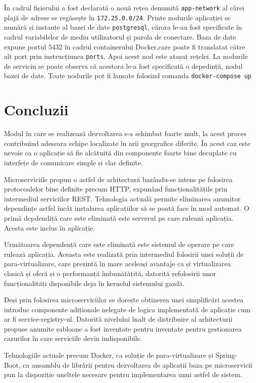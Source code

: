 \documentclass[12pt, a4paper, oneside, romanian]{teza-upb}
\begin{document}
În cadrul fișierului a fost declarată o nouă rețea denumită \texttt{app-network} al cărei plajă de adrese se regăsește în \texttt{172.25.0.0/24}. Printe nodurile aplicației se numără și instanțe al bazei de date \texttt{postgresql}, cărora le-au fost specificate în cadrul variabilelor de mediu utilizatorul și parola de conectare. Baza de date expune portul 5432 în cadrul containerului Docker,care poate fi translatat către alt port prin instrucțiunea \texttt{ports}. Apoi acest nod este atașat rețelei. La nodurile de serviciu se poate observa că acestora le-a fost specificată o depedință, nodul bazei de date. Toate nodurile pot fi lansate folosind comanda \texttt{docker-compose up}

\chapter{Concluzii}

Modul în care se realizează dezvoltarea s-a schimbat foarte mult, la acest proces contribuind adeseara echipe localizate în arii georgrafice diferite. În acest caz este nevoie ca o aplicație să fie alcătuită din componente foarte bine decuplate cu interfețe de comunicare simple și clar definite. 

Microserviciile propun o astfel de arhitectură bazându-se intens pe folosirea protocoalelor bine definite precum HTTP, expunând funcționalitățile prin intermediul serviciilor REST. Tehnologia actuală permite eliminarea anumitor dependințe astfel încât instalarea aplicațiilor să se poată face în mod automat. O primă depdendiță care este eliminată este serverul pe care rulează aplicația. Acesta este inclus în aplicație. 

Următoarea dependență care este eliminată este sistemul de operare pe care rulează aplicația. Aceasta este realizată prin intermediul folosirii unei soluții de para-virtualizare, care prezintă în mare aceleași avantaje ca și virtualizarea clasică și oferă și o performanță îmbunătățită, datorită refolosirii unor funcționalități disponibile deja în kernelul sistemului gazdă. 

Deși prin folosirea microserviciilor se dorește obtinerea unei simplificări acestea introduc componente adiționale nelegate de logica implementată de aplicație cum ar fi service-registry-ul. Datorită nivelului înalt de distribuire al arhitecturii propuse anumite șabloane a fost inventate pentru inventate pentru gestionarea cazurilor în care serviciile devin indisponibile. 

Tehnologiile actuale precum Docker, ca soluție de para-virtualizare și Spring-Boot, ca ansamblu de librării pentru dezvoltarea de aplicații baza pe microservicii pun la dispoziție uneltele necesare pentru implementarea unui astfel de sistem. 
\end{document}
